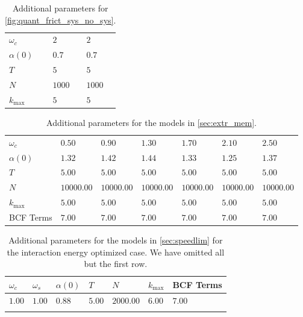 \begin{table}[H]
  \centering
  \begin{tabular}{lll}
    \hline
    $ω_c$              & $2$    & $2$    \\
    $α(0)$             & $0.7$  & $0.7$  \\
    $T$                & $5$    & $5$    \\
    $N$                & $1000$ & $1000$ \\
    $k_{\mathrm{max}}$ & $5$    & $5$    \\
    \hline
  \end{tabular}
  \caption{\label{tab:plus_system}Additional parameters for
    \cref{fig:quant_frict_sys_no_sys}.}
\end{table}

\begin{table}[H]
  \centering
  \begin{tabular}{lllllll}
    \hline
    $ω_c$              & $0.50$     & $0.90$     & $1.30$     & $1.70$     & $2.10$     & $2.50$     \\
    $α(0)$             & $1.32$     & $1.42$     & $1.44$     & $1.33$     & $1.25$     & $1.37$     \\
    $T$                & $5.00$     & $5.00$     & $5.00$     & $5.00$     & $5.00$     & $5.00$     \\
    $N$                & $10000.00$ & $10000.00$ & $10000.00$ & $10000.00$ & $10000.00$ & $10000.00$ \\
    $k_{\mathrm{max}}$ & $5.00$     & $5.00$     & $5.00$     & $5.00$     & $5.00$     & $5.00$     \\
    BCF Terms          & $7.00$     & $7.00$     & $7.00$     & $7.00$     & $7.00$     & $7.00$     \\
    \hline
  \end{tabular}

  \caption{\label{tab:plus_omega}Additional parameters for the models in
     \cref{sec:extr_mem}.}
\end{table}

\begin{longtable}[c]{lllllll}
  \toprule
   $ω_c$   & $ω_s$   & $α(0)$   & $T$    & $N$       & $k_{\mathrm{max}}$   & BCF Terms   \\
  \midrule
   $1.00$  & $1.00$  & $0.88$   & $5.00$ & $2000.00$ & $6.00$
                                                                            & $7.00$      \\
  \bottomrule
  \caption{\label{tab:plus_mod_en}Additional parameters for the models in
     \cref{sec:speedlim} for the interaction energy optimized case. We
  have omitted all but the first row.}
\end{longtable}


